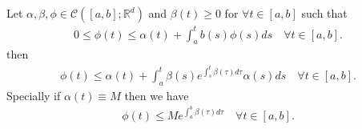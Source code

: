\begin{lemma}\label{gronwall_lemma}
  Let $\alpha ,\beta ,\phi  \in  \mathcal{C}([a,b];\mathbb{R}^{d} )$  and $\beta (t) \ge 0$ for $\forall t \in [a,b]$ 
  such that 
  \begin{align*}
    0 \le  \phi(t) \le  \alpha(t) + \int_a^{t} b(s)\phi(s) ds \quad \forall t \in [a,b] 
  .\end{align*}
  then 
  \begin{align*}
    \phi(t) \le  \alpha(t) + \int_a^{t}  \beta(s) e^{\int_s^{t} \beta(\tau ) d\tau  }  \alpha(s) ds \quad \forall t \in [a,b]
  .\end{align*}
  Specially if $\alpha(t) \equiv M$ then we have 
  \begin{align*}
    \phi(t) \le  M e^{\int_a^{b} \beta(\tau )d\tau  }  \quad \forall t \in [a,b]
  .\end{align*}
\end{lemma}
